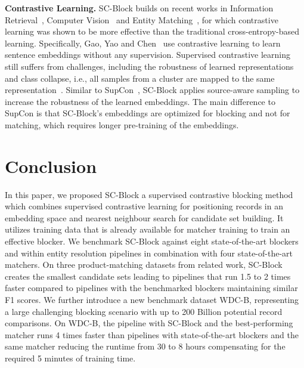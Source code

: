 \documentclass[sigconf,nonacm]{acmart}
\begin{document}
\vspace{.05cm}\noindent\textbf{Contrastive Learning.}
SC-Block builds on recent works in Information Retrieval~\cite{gao_simcse_2021}, Computer Vision~\cite{khosla_supervised_2020} and Entity Matching~\cite{peeters_supervised_2022}, for which contrastive learning was shown to be more effective than the traditional cross-entropy-based learning.  Specifically, Gao, Yao and Chen~\cite{gao_simcse_2021} use contrastive learning to learn sentence embeddings without any supervision. Supervised contrastive learning still suffers from challenges, including the robustness of learned representations~\cite{chuang_debiased_2020} and class collapse, i.e., all samples from a cluster are mapped to the same representation~\cite{chen_perfectly_2022}.
Similar to SupCon~\cite{peeters_supervised_2022}, SC-Block applies source-aware sampling to increase the robustness of the learned embeddings.
The main difference to SupCon is that SC-Block's embeddings are optimized for blocking and not for matching, which requires longer pre-training of the embeddings.





%
 \section{Conclusion}
\label{sec:conclusion}

In this paper, we proposed SC-Block a supervised contrastive blocking method which combines supervised contrastive learning for positioning records in an embedding space and nearest neighbour search for candidate set building. It utilizes training data that is already available for matcher training to train an effective blocker.
We benchmark SC-Block against eight state-of-the-art blockers and within entity resolution pipelines in combination with four state-of-the-art matchers.
On three product-matching datasets from related work, SC-Block creates the smallest candidate sets leading to pipelines that run 1.5 to 2 times faster compared to pipelines with the benchmarked blockers maintaining similar F1 scores.
We further introduce a new benchmark dataset WDC-B, representing a large challenging blocking scenario with up to 200 Billion potential record comparisons.
On WDC-B, the pipeline with SC-Block and the best-performing matcher runs 4 times faster than pipelines with state-of-the-art blockers and the same matcher reducing the runtime from 30 to 8 hours compensating for the required 5 minutes of training time. 
 


\end{document}
